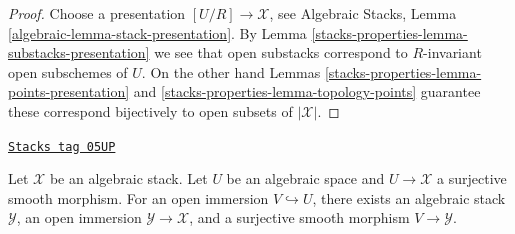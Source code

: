 \begin{proof}
Choose a presentation $[U/R] \to \mathcal{X}$, see
Algebraic Stacks, Lemma \ref{algebraic-lemma-stack-presentation}.
By
Lemma \ref{stacks-properties-lemma-substacks-presentation}
we see that open substacks correspond to $R$-invariant open subschemes
of $U$. On the other hand
Lemmas \ref{stacks-properties-lemma-points-presentation} and \ref{stacks-properties-lemma-topology-points}
guarantee these correspond bijectively to open subsets of $|\mathcal{X}|$.
\end{proof}

\begin{lemma}
\label{stacks-properties-lemma-open-image-substack}
\href{https://stacks.math.columbia.edu/tag/05UP}{\texttt{Stacks tag 05UP}}

Let $\mathcal X$ be an algebraic stack. Let $U$ be an algebraic space and
$U \to \mathcal X$ a surjective smooth morphism. For an open immersion
$V \hookrightarrow U$, there exists an algebraic stack $\mathcal Y$, an
open immersion $\mathcal Y \to \mathcal X$, and a surjective smooth
morphism $V \to \mathcal Y$.
\end{lemma}

